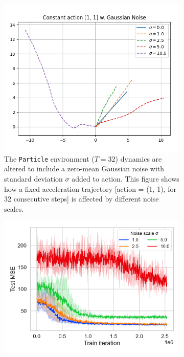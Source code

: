 \documentclass[nohyperref]{article}
\begin{document}
\begin{figure}[]
    \centering
    \begin{subfigure}{0.45\textwidth}
        \centering
        \includegraphics[width=\textwidth,keepaspectratio]{figures/NoisyParticle_env.png}
        \caption{The \texttt{Particle} environment ($T=32$) dynamics are altered to include a zero-mean Gaussian noise with standard deviation $\sigma$ added to action. This figure shows how a fixed acceleration trajectory [action = (1, 1), for 32 consecutive steps] is affected by different noise scales. }
        \label{fig:noisy_particle_env}
    \end{subfigure}
    \hspace{2em}
    \begin{subfigure}{0.45\textwidth}
        \centering
        \includegraphics[width=\textwidth,keepaspectratio]{figures/iclr_plots/IT-IN_on_NoisyParticle_New.png}

\end{subfigure}
\end{figure}
\end{document}

